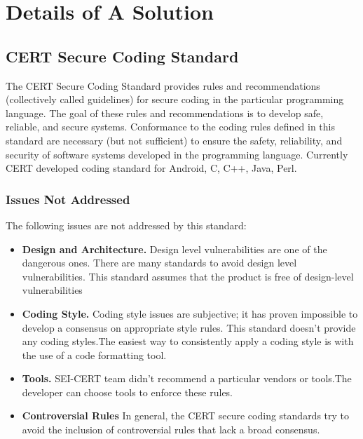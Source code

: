 \chapter{Details of A Solution}
\section{CERT Secure Coding Standard }
The CERT Secure Coding Standard provides rules and recommendations (collectively called guidelines) for secure coding in the particular programming language. The goal of these rules and recommendations is to develop safe, reliable, and secure systems. Conformance to the coding rules defined in this standard are necessary (but not sufficient) to ensure the safety, reliability, and security of software systems developed in the programming language. 
Currently CERT developed coding standard for Android, C, C++, Java, Perl.

\subsection{Issues Not Addressed}
The following issues are not addressed by this standard:
\begin{itemize}
	\item \textbf{Design and Architecture.} Design level vulnerabilities are one of the dangerous ones. There are many standards to avoid design level vulnerabilities. This standard assumes that the product is free of design-level vulnerabilities
	
	\item \textbf{Coding Style.} Coding style issues are subjective; it has proven impossible to develop a
	consensus on appropriate style rules. This standard doesn't provide any coding styles.The easiest way to consistently apply a coding style is with the
	use of a code formatting tool. 
	
	\item \textbf{Tools.} SEI-CERT team didn't recommend  a particular vendors or
	tools.The developer can choose tools to enforce these rules.
	\item \textbf{ Controversial Rules} In general, the CERT secure coding standards try to avoid the
	inclusion of controversial rules that lack a broad consensus.
\end{itemize}
